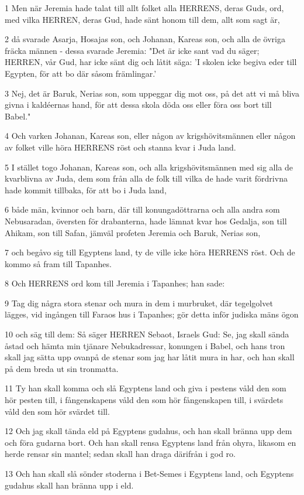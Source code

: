 \par 1 Men när Jeremia hade talat till allt folket alla HERRENS, deras Guds, ord, med vilka HERREN, deras Gud, hade sänt honom till dem, allt som sagt är,
\par 2 då svarade Asarja, Hosajas son, och Johanan, Kareas son, och alla de övriga fräcka männen - dessa svarade Jeremia: "Det är icke sant vad du säger; HERREN, vår Gud, har icke sänt dig och låtit säga: 'I skolen icke begiva eder till Egypten, för att bo där såsom främlingar.'
\par 3 Nej, det är Baruk, Nerias son, som uppeggar dig mot oss, på det att vi må bliva givna i kaldéernas hand, för att dessa skola döda oss eller föra oss bort till Babel."
\par 4 Och varken Johanan, Kareas son, eller någon av krigshövitsmännen eller någon av folket ville höra HERRENS röst och stanna kvar i Juda land.
\par 5 I stället togo Johanan, Kareas son, och alla krigshövitsmännen med sig alla de kvarblivna av Juda, dem som från alla de folk till vilka de hade varit fördrivna hade kommit tillbaka, för att bo i Juda land,
\par 6 både män, kvinnor och barn, där till konungadöttrarna och alla andra som Nebusaradan, översten för drabanterna, hade lämnat kvar hos Gedalja, son till Ahikam, son till Safan, jämväl profeten Jeremia och Baruk, Nerias son,
\par 7 och begåvo sig till Egyptens land, ty de ville icke höra HERRENS röst. Och de kommo så fram till Tapanhes.
\par 8 Och HERRENS ord kom till Jeremia i Tapanhes; han sade:
\par 9 Tag dig några stora stenar och mura in dem i murbruket, där tegelgolvet lägges, vid ingången till Faraos hus i Tapanhes; gör detta inför judiska mäns ögon
\par 10 och säg till dem: Så säger HERREN Sebaot, Israels Gud: Se, jag skall sända åstad och hämta min tjänare Nebukadressar, konungen i Babel, och hans tron skall jag sätta upp ovanpå de stenar som jag har låtit mura in har, och han skall på dem breda ut sin tronmatta.
\par 11 Ty han skall komma och slå Egyptens land och giva i pestens våld den som hör pesten till, i fångenskapens våld den som hör fångenskapen till, i svärdets våld den som hör svärdet till.
\par 12 Och jag skall tända eld på Egyptens gudahus, och han skall bränna upp dem och föra gudarna bort. Och han skall rensa Egyptens land från ohyra, likasom en herde rensar sin mantel; sedan skall han draga därifrån i god ro.
\par 13 Och han skall slå sönder stoderna i Bet-Semes i Egyptens land, och Egyptens gudahus skall han bränna upp i eld.

